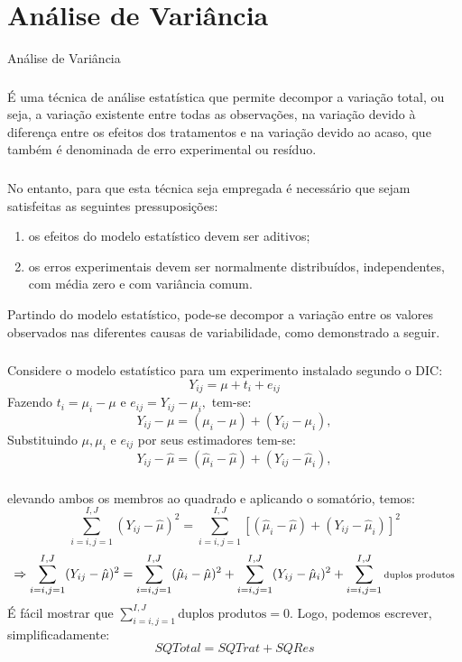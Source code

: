 \documentclass[14pt,aspectratio=1610]{beamer}
\begin{document}
\section{Análise de Variância}
\begin{frame}{Análise de Variância}
\frametitle{}
\begin{block}{}
\justifying
É uma técnica de análise estatística que permite decompor a variação total, ou
seja, a variação existente entre todas as observações, na variação devido à diferença
entre os efeitos dos tratamentos e na variação devido ao acaso, que também é
denominada de erro experimental ou resíduo.
\end{block}
\end{frame}

\begin{frame}{}
\frametitle{}
\begin{block}{}
\justifying
No entanto, para que esta técnica seja empregada é necessário que sejam
satisfeitas as seguintes pressuposições:
\begin{enumerate}
\item os efeitos do modelo estatístico devem ser aditivos;\pause
\item os erros experimentais devem ser normalmente distribuídos, independentes, com
média zero e com variância comum.
\end{enumerate}
Partindo do modelo estatístico, pode-se decompor a variação entre os valores
observados nas diferentes causas de variabilidade, como demonstrado a seguir.
\end{block}
\end{frame}

\begin{frame}{}
\frametitle{}
\begin{block}{}
\justifying
Considere o modelo estatístico para um experimento instalado segundo o DIC:
$$Y_{ij}=\mu+t_{i}+e_{ij}$$\pause
Fazendo $t_{i}=\mu_{i}-\mu$ e $e_{ij}=Y_{ij}-\mu_{i},$ tem-se:\pause
$$Y_{ij}-\mu=(\mu_{i}-\mu)+(Y_{ij}-\mu_{i}),$$\pause
Substituindo $\mu,\mu_{i}$ e $e_{ij}$ por seus estimadores tem-se:\pause
$$Y_{ij}-\hat{\mu}=(\hat{\mu}_{i}-\hat{\mu})+(Y_{ij}-\hat{\mu}_{i}),$$
\end{block}
\end{frame}

\begin{frame}{}
\frametitle{}
\begin{block}{}
\justifying
elevando ambos os membros ao quadrado e aplicando o somatório, temos:
$${\displaystyle \sum_{i=i,j=1}^{I,J}(Y_{ij}-\hat{\mu})^{2}=\sum_{i=i,j=1}^{I,J}\left[(\hat{\mu}_{i}-\hat{\mu})+(Y_{ij}-\hat{\mu}_{i})\right]^{2}}$$
$$\Rightarrow{\scriptsize{\displaystyle \sum_{i=i,j=1}^{I,J}(Y_{ij}-\hat{\mu})^{2}=\sum_{i=i,j=1}^{I,J}(\hat{\mu}_{i}-\hat{\mu})^{2}+\sum_{i=i,j=1}^{I,J}(Y_{ij}-\hat{\mu}_{i})^{2}+\sum_{i=i,j=1}^{I,J}\textrm{duplos produtos}}}$$
É fácil mostrar que ${\displaystyle \sum_{i=i,j=1}^{I,J}\textrm{duplos produtos}=0.}$ Logo, podemos escrever, simplificadamente:
$$SQTotal=SQTrat+SQRes$$
\end{block}
\end{frame}
\end{document}
